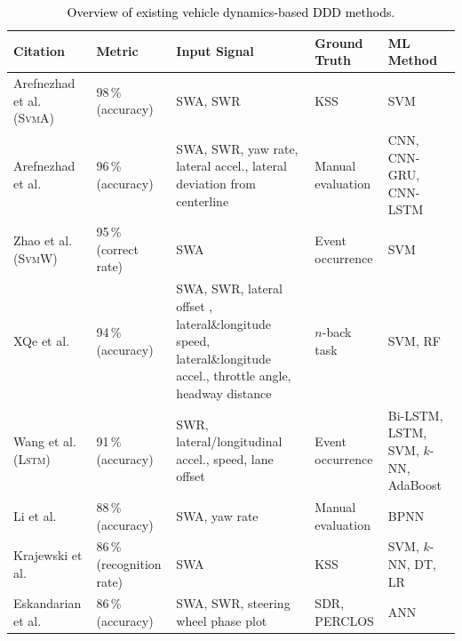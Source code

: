 \documentclass[letterpaper, 10 pt, conference]{ieeeconf}  %
\newcommand{\Review}[1]{\textcolor{black}{#1}}
\newcommand{\Impl}[1]{\textsc{#1}}
\begin{document}
\begin{table}[t]
    \centering
    \caption{\Review{Overview of existing vehicle dynamics-based DDD methods.}}
    \label{tab_all_ddd}
    \begin{tabular}{|m{2.8cm}|m{3.0cm}|>{\centering\arraybackslash}m{4.7cm}|>{\centering\arraybackslash}m{2.0cm}|>{\centering\arraybackslash}m{3cm}|}
        \hline
        \centering \textbf{Citation} 
        & \centering \textbf{Metric} & \centering \textbf{Input Signal} & \!\!\!\!\!\! \centering \textbf{Ground Truth} \!\!\!\!\!\! & \textbf{ML Method} \\
        \hline\hline
        Arefnezhad et al.
        \cite{Arefnezhad2019} (\Impl{SvmA}) & 98\,\% (accuracy) & SWA, SWR & KSS & {SVM} \\
        \hline
        Arefnezhad et al.
        \cite{Arefnezhad2020} & 96\,\% (accuracy) & SWA, SWR, yaw rate, lateral accel., lateral deviation from centerline 
        & %
        Manual evaluation
        & {CNN, CNN-GRU, CNN-LSTM} \\
        \hline
        Zhao et al.
        \cite{Zhao2009} (\Impl{SvmW}) & 95\,\% (correct rate) & SWA 
        & %
        Event occurrence
        & {SVM} \\
        \hline
        XQe et al.
        \cite{Xue2023} & 94\,\% (accuracy) & SWA, SWR, lateral offset , lateral\&longitude speed, lateral\&longitude accel., throttle angle, headway distance & $n$-back task 
        & {SVM, RF} \\
        \hline
        Wang et al.
        \cite{Wang2022} (\Impl{Lstm}) & 91\,\% (accuracy) & SWR, lateral/longitudinal accel., speed, lane offset 
        & %
        Event occurrence
        & {Bi-LSTM, LSTM, SVM, $k$-NN, AdaBoost} 
        \\ 
        \hline
        Li et al.
        \cite{Li2017_2} & 88\,\% (accuracy) & SWA, yaw rate 
        & %
        Manual evaluation
        & {BPNN} \\
        \hline
        Krajewski et al.
        \cite{Krajewski2009} & 86\,\% (recognition rate) & SWA & KSS & {SVM, $k$-NN, DT, LR} \\
        \hline
        \!\!\! Eskandarian et al.
        \cite{Eskandarian2007} \!\!\! & 86\,\% (accuracy) 
        & SWA, SWR, steering wheel phase plot & SDR, PERCLOS & {ANN} \\

\end{tabular}
\end{table}
\end{document}
